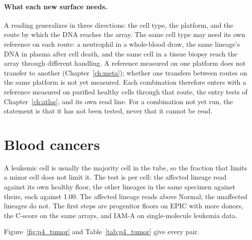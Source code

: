 \paragraph{What each new surface needs.} A reading generalizes in three directions: the cell type, the platform, and the route by which
the DNA reaches the array. The same cell type may need its own reference on each route: a neutrophil in a whole-blood draw, the same
lineage's DNA in plasma after cell death, and the same cell in a tissue biopsy reach the array through different handling. A reference
measured on one platform does not transfer to another (Chapter~\ref{ch:meta}); whether one transfers between routes on the same
platform is not yet measured. \openprob{} Each combination therefore enters with a reference measured on purified healthy cells through
that route, the entry tests of Chapter~\ref{ch:atlas}, and its own read line. For a combination not yet run, the statement is that it
has not been tested, never that it cannot be read.

\section{Blood cancers}

A leukemic cell is usually the majority cell in the tube, so the fraction that limits a minor cell does not limit it. The test is per cell: the affected
lineage read against its own healthy floor, the other lineages in the same specimen against theirs, each against 1.00. \prediction{} The affected lineage
reads above Normal; the unaffected lineages do not. The first steps are progenitor floors on EPIC with more donors, the C-score on the same arrays, and IAM-A on single-molecule
leukemia data. \openprob

Figure~\ref{fig:p4_tumor} and Table~\ref{tab:p4_tumor} give every pair.

